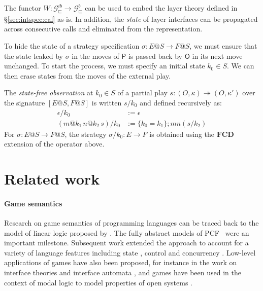 \documentclass[sigplan,screen]{acmart}
\newcommand{\gcat}{\mathcal{G}_{\sqsubseteq}}
\newcommand{\kw}[1]{\ensuremath{ \mathsf{#1} }}
\begin{document}
The functor
$W : \gcat^{ib} \rightarrow \gcat^b$
can be used to embed the layer theory
defined in \S\ref{sec:intspec:cal} as-is.
In addition, the \emph{state} of layer interfaces
can be propagated across consecutive calls and
eliminated from the representation.

To hide the state of a strategy specification
$\sigma : E@S \rightarrow F@S$,
we must ensure that the state
leaked by $\sigma$ in the moves of $\kw{P}$
is passed back by $\kw{O}$ in its next move unchanged.
To start the process,
we must specify an initial state $k_0 \in S$.
We can then erase states from the moves of the external play.

\begin{definition}
The \emph{state-free observation} at $k_0 \in S$
of a partial play
$s : (O, \kappa) \twoheadrightarrow (O, \kappa')$
over the signature $[E@S, F@S]$
is written $s/k_0$ and defined recursively as:
\begin{align*}
    \epsilon / k_0 &:= \epsilon \\
    (m@k_1 \, n@k_2 \, s) / k_0 &:=
      \{ k_0 = k_1 \} ; m n (s / k_2)
\end{align*}
For $\sigma : E@S \rightarrow F@S$,
the strategy $\sigma / k_0 : E \rightarrow F$
is obtained using the $\mathbf{FCD}$ extension
of the operator above.
\end{definition}



\section{Related work} \label{sec:rw} %

%

\paragraph{Game semantics}

Research on game semantics of programming languages
can be traced back to the model of linear logic
proposed by \citet{gsll}.
The fully abstract models of PCF~\cite{pcfajm,pcfho}
were an important milestone.
Subsequent work
extended the approach to account for a variety of
language features including
state \cite{gsia},
control \cite{gscontrol} and
concurrency \cite{asfgc,agames,cgames}.
Low-level applications of games have also been proposed,
for instance in the work on interface theories
and interface automata \cite{ia,gmos,itcd,gtf},
and games have been used in the context of modal logic
to model properties of open systems
\cite{atl,altref}.
\end{document}
